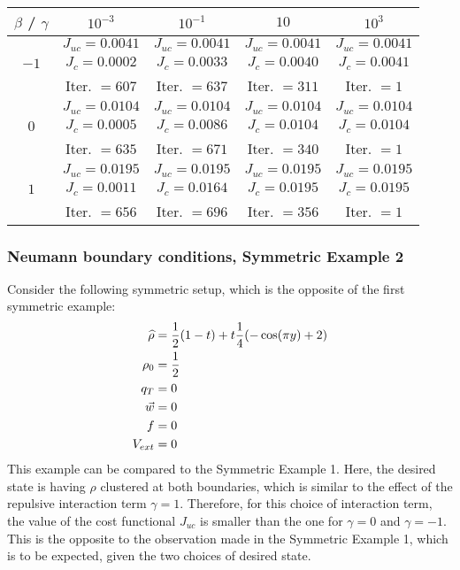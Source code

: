 \begin{table}
	\begin{tabular}{ ||c|| c | c |c | c ||}
		\hline
		$\beta$ / $\gamma$ & $10^{-3}$  & $10^{-1}$  & $10$ & $10^3$ \\ 
		\hline 
		& $J_{uc} = 0.0041$ & $J_{uc} = 0.0041$  & $J_{uc} = 0.0041$ & $J_{uc} = 0.0041$\\ 
		$-1$ & $J_c = 0.0002$ & $J_c = 0.0033$ & $J_c = 0.0040$ & $J_c = 0.0041$\\ 
		& Iter. $= 607$ & Iter. $= 637$  & Iter. $= 311$ & Iter. $= 1$\\ 
		\hline
		& $J_{uc} = 0.0104$ & $J_{uc} = 0.0104$  & $J_{uc} = 0.0104$& $J_{uc} = 0.0104$\\
		$0$  & $J_c = 0.0005$ & $J_c = 0.0086$  & $J_c = 0.0104$ & $J_c = 0.0104$\\ 
		& Iter. $= 635$ & Iter. $= 671$  & Iter. $= 340$ & Iter. $= 1$\\ 
		\hline
		& $J_{uc} = 0.0195$ & $J_{uc} = 0.0195$  & $J_{uc} = 0.0195$ & $J_{uc} = 0.0195$\\
		$1$  & $J_c = 0.0011$ & $J_c = 0.0164$  & $J_c = 0.0195$ & $J_c = 0.0195$\\ 
		& Iter. $= 656$ & Iter. $= 696$  & Iter. $= 356$ & Iter. $= 1$\\ 
		\hline 
	\end{tabular}
	\caption{}
	\label{TabNFlowAddEx1}
\end{table}


\subsubsection{Neumann boundary conditions, Symmetric Example 2}
Consider the following symmetric setup, which is the opposite of the first symmetric example:
\begin{align*}
\widehat \rho &= \frac{1}{2}(1-t) + t\frac{1}{4}(-\cos(\pi y)+2)\\
\rho_{0} &= \frac{1}{2}\\
q_{T} &= 0\\
\vec{w} &= 0\\
f &=0\\
V_{ext} &=0
\end{align*}
This example can be compared to the Symmetric Example 1. Here, the desired state is having $\rho$ clustered at both boundaries, which is similar to the effect of the repulsive interaction term $\gamma = 1$. Therefore, for this choice of interaction term, the value of the cost functional $J_{uc}$ is smaller than the one for $\gamma = 0$ and $\gamma = -1$. This is the opposite to the observation made in the Symmetric Example 1, which is to be expected, given the two choices of desired state.

